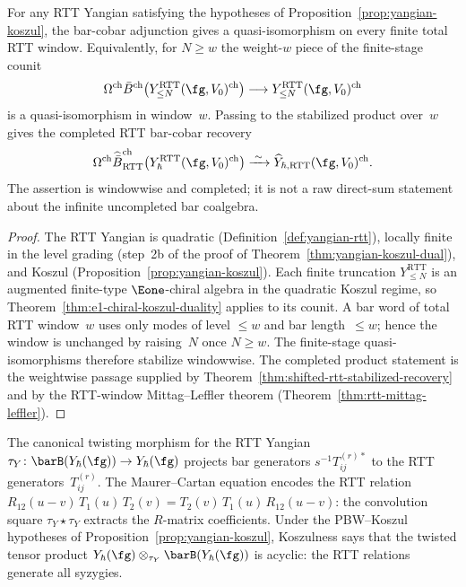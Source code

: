 \begin{corollary}
\label{cor:yangian-bar-cobar}
For any RTT Yangian satisfying the hypotheses of
Proposition~\ref{prop:yangian-koszul}, the bar-cobar adjunction gives
a quasi-isomorphism on every finite total RTT window. Equivalently,
for $N\geq w$ the weight-$w$ piece of the finite-stage counit
\[
\Omega^{\mathrm{ch}}\bar{B}^{\mathrm{ch}}
\bigl(Y_{\leq N}^{\mathrm{RTT}}(\fg,V_0)^{\mathrm{ch}}\bigr)
\longrightarrow
Y_{\leq N}^{\mathrm{RTT}}(\fg,V_0)^{\mathrm{ch}}
\]
is a quasi-isomorphism in window~$w$. Passing to the stabilized
product over~$w$ gives the completed RTT bar-cobar recovery
\[
\Omega^{\mathrm{ch}}\widehat{\bar{B}}_{\mathrm{RTT}}^{\mathrm{ch}}
\bigl(Y_{\hbar}^{\mathrm{RTT}}(\fg,V_0)^{\mathrm{ch}}\bigr)
\xrightarrow{\;\sim\;}
\widehat{Y}_{\hbar,\mathrm{RTT}}(\fg,V_0)^{\mathrm{ch}}.
\]
The assertion is windowwise and completed; it is not a raw
direct-sum statement about the infinite uncompleted bar coalgebra.
\end{corollary}

\begin{proof}
The RTT Yangian is quadratic (Definition~\ref{def:yangian-rtt}),
locally finite in the level grading (step~2b of the proof of
Theorem~\ref{thm:yangian-koszul-dual}), and Koszul
(Proposition~\ref{prop:yangian-koszul}). Each finite truncation
$Y_{\leq N}^{\mathrm{RTT}}$ is an augmented finite-type
$\Eone$-chiral algebra in the quadratic Koszul regime, so
Theorem~\ref{thm:e1-chiral-koszul-duality} applies to its counit.
A bar word of total RTT window~$w$ uses only modes of level
${\leq}w$ and bar length~${\leq}w$; hence the window is unchanged by
raising~$N$ once $N\geq w$. The finite-stage quasi-isomorphisms
therefore stabilize windowwise. The completed product statement is
the weightwise passage supplied by
Theorem~\ref{thm:shifted-rtt-stabilized-recovery} and by the
RTT-window Mittag--Leffler theorem
\textup{(}Theorem~\textup{\ref{thm:rtt-mittag-leffler}}\textup{)}.
\end{proof}

\begin{remark}
\label{rem:yangian-twisting-morphism}
The canonical twisting morphism for the RTT Yangian
$\tau_Y \colon \barB(Y_\hbar(\fg)) \to Y_\hbar(\fg)$
projects bar generators $s^{-1}T_{ij}^{(r)*}$ to the RTT
generators~$T_{ij}^{(r)}$. The Maurer--Cartan equation encodes the
RTT relation $R_{12}(u-v)\, T_1(u)\, T_2(v) = T_2(v)\, T_1(u)\, R_{12}(u-v)$:
the convolution square $\tau_Y \star \tau_Y$ extracts the $R$-matrix
coefficients. Under the PBW--Koszul hypotheses of
Proposition~\ref{prop:yangian-koszul}, Koszulness
says that the twisted tensor product
$Y_\hbar(\fg) \otimes_{\tau_Y} \barB(Y_\hbar(\fg))$
is acyclic: the RTT relations generate all syzygies.
\end{remark}

